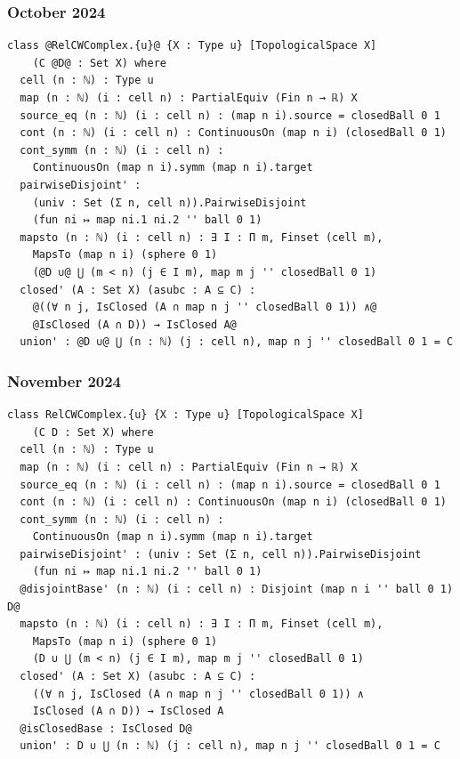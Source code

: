 \documentclass{beamer}
\begin{document}
\begin{frame}[fragile]
\frametitle{October 2024}
\begin{lstlisting}[basicstyle=\ttfamily\scriptsize]
class @RelCWComplex.{u}@ {X : Type u} [TopologicalSpace X]
    (C @D@ : Set X) where
  cell (n : ℕ) : Type u
  map (n : ℕ) (i : cell n) : PartialEquiv (Fin n → ℝ) X
  source_eq (n : ℕ) (i : cell n) : (map n i).source = closedBall 0 1
  cont (n : ℕ) (i : cell n) : ContinuousOn (map n i) (closedBall 0 1)
  cont_symm (n : ℕ) (i : cell n) : 
    ContinuousOn (map n i).symm (map n i).target
  pairwiseDisjoint' :
    (univ : Set (Σ n, cell n)).PairwiseDisjoint 
    (fun ni ↦ map ni.1 ni.2 '' ball 0 1)
  mapsto (n : ℕ) (i : cell n) : ∃ I : Π m, Finset (cell m),
    MapsTo (map n i) (sphere 0 1) 
    (@D ∪@ ⋃ (m < n) (j ∈ I m), map m j '' closedBall 0 1)
  closed' (A : Set X) (asubc : A ⊆ C) :
    @((∀ n j, IsClosed (A ∩ map n j '' closedBall 0 1)) ∧@
    @IsClosed (A ∩ D)) → IsClosed A@
  union' : @D ∪@ ⋃ (n : ℕ) (j : cell n), map n j '' closedBall 0 1 = C
\end{lstlisting}
\end{frame}

\begin{frame}[fragile]
\frametitle{November 2024}
\begin{lstlisting}[basicstyle=\ttfamily\scriptsize]
class RelCWComplex.{u} {X : Type u} [TopologicalSpace X] 
    (C D : Set X) where
  cell (n : ℕ) : Type u
  map (n : ℕ) (i : cell n) : PartialEquiv (Fin n → ℝ) X
  source_eq (n : ℕ) (i : cell n) : (map n i).source = closedBall 0 1
  cont (n : ℕ) (i : cell n) : ContinuousOn (map n i) (closedBall 0 1)
  cont_symm (n : ℕ) (i : cell n) : 
    ContinuousOn (map n i).symm (map n i).target
  pairwiseDisjoint' : (univ : Set (Σ n, cell n)).PairwiseDisjoint 
    (fun ni ↦ map ni.1 ni.2 '' ball 0 1)
  @disjointBase' (n : ℕ) (i : cell n) : Disjoint (map n i '' ball 0 1) D@
  mapsto (n : ℕ) (i : cell n) : ∃ I : Π m, Finset (cell m),
    MapsTo (map n i) (sphere 0 1) 
    (D ∪ ⋃ (m < n) (j ∈ I m), map m j '' closedBall 0 1)
  closed' (A : Set X) (asubc : A ⊆ C) : 
    ((∀ n j, IsClosed (A ∩ map n j '' closedBall 0 1)) ∧ 
    IsClosed (A ∩ D)) → IsClosed A
  @isClosedBase : IsClosed D@
  union' : D ∪ ⋃ (n : ℕ) (j : cell n), map n j '' closedBall 0 1 = C
\end{lstlisting}
\end{frame}
\end{document}
